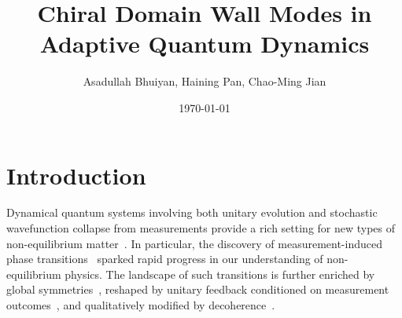 \documentclass[aps,prb,twocolumn,superscriptaddress,longbibliography,floatfix]{revtex4-2}
\begin{document}
\raggedbottom

\title{Chiral Domain Wall Modes in Adaptive Quantum Dynamics}
\author{Asadullah Bhuiyan, Haining Pan, Chao-Ming Jian}
\noaffiliation
\date{\today}

\begin{abstract}
\end{abstract}

\maketitle

\setcounter{tocdepth}{2}
\tableofcontents

\section{Introduction}

Dynamical quantum systems involving both unitary evolution and stochastic wavefunction collapse from measurements provide a rich setting for new types of non-equilibrium matter~\cite{PotterVasseur2022,FisherKhemaniNahumVijay2023}.
In particular, the discovery of measurement-induced phase
transitions~\cite{LiChenFisher2018,SkinnerRuhmanNahum2019,ChanNandkishorePretkoSmith2019,LiChenFisher2019,GullansHuse2020}
sparked rapid progress in our understanding of non-equilibrium physics. The landscape of such transitions is further enriched by global symmetries~\cite{SangHsieh2021,BaoChoiAltman2021,LavasaniAlaviradBarkeshli2021,AgrawalEtAl2022,BarrattEtAl2022,MajidyEtAl2023}, reshaped by unitary feedback conditioned on measurement outcomes~\cite{IadecolaEtAl2023,RavindranathEtAl2023,PiroliEtAl2023,SierantTurkeshi2023,ODeaEtAl2024}, and qualitatively modified by
decoherence~\cite{WeinsteinBaoAltman2022,LiSangHsieh2023,LiuLiZhangJian2024,IvakiOjanenMoghaddam2025}.
\end{document}
